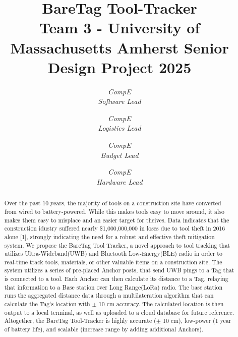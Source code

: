 \documentclass[conference]{IEEEtran}
\begin{document}
\title{BareTag Tool-Tracker\\
{\footnotesize {Team 3 - University of Massachusetts Amherst Senior Design Project 2025 }}
}

\author{
\textit{CompE}\\
\textit{Software Lead}

\and
{}
\textit{CompE}\\
\textit{Logistics Lead}

\and
{}
\textit{CompE}\\
\textit{Budget Lead}

\and
{}
\textit{CompE}\\
\textit{Hardware Lead}

}

\maketitle

\begin{abstract}
    Over the past 10 years, the majority of tools on a construction 
    site have converted from wired to battery-powered. While this 
    makes tools easy to move around, it also makes them easy to misplace
    and an easier target for theives. Data indicates that the construction
    idustry suffered nearly \$1,000,000,000 in loses due to tool theft in
    2016 alone [1], strongly indicating the need for a robust and effective 
    theft mitigation system. We propose the BareTag Tool Tracker, a novel
    approach to tool tracking that utilizes Ultra-Wideband(UWB) and Bluetooth 
    Low-Energy(BLE) radio in order to real-time track tools, materials, or other 
    valuable items on a construction site. The system utilizes a series
    of pre-placed Anchor posts, that send UWB pings to a Tag that is connected
    to a tool. Each Anchor can then calculate its distance to a Tag, relaying
    that information to a Base station over Long Range(LoRa) radio. The 
    base station runs the aggregated distance data through a multilateration
    algorithm that can calculate the Tag's location with $\pm$ 10 cm accuracy.
    The calculated location is then output to a local terminal, as well as 
    uploaded to a cloud database for future reference. Altogether, the BareTag Tool-Tracker
    is highly accurate ($\pm$ 10 cm), low-power (1 year of battery life), and
    scalable (increase range by adding additional Anchors).
\end{abstract}
\end{document}
